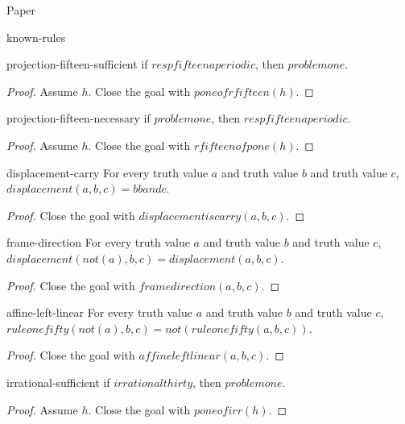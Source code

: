 \begin{lexlean}{Paper}
\begin{section}{known-rules}
  \begin{theorem}{projection-fifteen-sufficient}
  if \(respfifteenaperiodic\), then \(problemone\).
  \begin{proof}
  Assume \(h\).
  Close the goal with \(poneofrfifteen(h)\).
  \end{proof}
  \end{theorem}

  \begin{theorem}{projection-fifteen-necessary}
  if \(problemone\), then \(respfifteenaperiodic\).
  \begin{proof}
  Assume \(h\).
  Close the goal with \(rfifteenofpone(h)\).
  \end{proof}
  \end{theorem}

  \begin{theorem}{displacement-carry}
  For every truth value \(a\) and truth value \(b\) and truth value \(c\), \(displacement(a, b, c) = b band c\).
  \begin{proof}
  Close the goal with \(displacementiscarry(a, b, c)\).
  \end{proof}
  \end{theorem}

  \begin{theorem}{frame-direction}
  For every truth value \(a\) and truth value \(b\) and truth value \(c\), \(displacement(not(a), b, c) = displacement(a, b, c)\).
  \begin{proof}
  Close the goal with \(framedirection(a, b, c)\).
  \end{proof}
  \end{theorem}

  \begin{theorem}{affine-left-linear}
  For every truth value \(a\) and truth value \(b\) and truth value \(c\), \(ruleonefifty(not(a), b, c) = not(ruleonefifty(a, b, c))\).
  \begin{proof}
  Close the goal with \(affineleftlinear(a, b, c)\).
  \end{proof}
  \end{theorem}

  \begin{theorem}{irrational-sufficient}
  if \(irrationalthirty\), then \(problemone\).
  \begin{proof}
  Assume \(h\).
  Close the goal with \(poneofirr(h)\).
  \end{proof}
  \end{theorem}


\end{section}
\end{lexlean}
